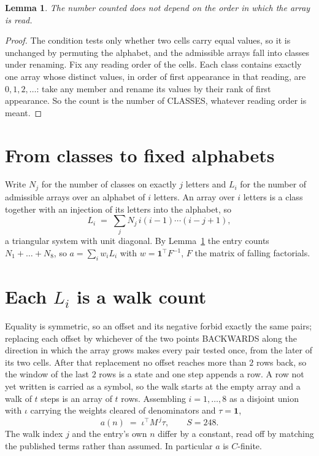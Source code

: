 \documentclass[11pt,a4paper]{article}
\theoremstyle{plain}
\newtheorem{lemma}[theorem]{Lemma}
\theoremstyle{definition}
\begin{document}
\begin{lemma}\label{lem:order}
The number counted does not depend on the order in which the array is read.
\end{lemma}

\begin{proof}
The condition tests only whether two cells carry equal values, so it is unchanged by permuting
the alphabet, and the admissible arrays fall into classes under renaming. Fix any reading order
of the cells. Each class contains exactly one array whose distinct values, in order of first
appearance in that reading, are $0,1,2,\dots$: take any member and rename its values by their
rank of first appearance. So the count is the number of CLASSES, whatever reading order is
meant.
\end{proof}

\section{From classes to fixed alphabets}

Write $N_j$ for the number of classes on exactly $j$ letters and $L_i$ for the number of
admissible arrays over an alphabet of $i$ letters. An array over $i$ letters is a class together
with an injection of its letters into the alphabet, so
\[
L_i\;=\;\sum_j N_j\,i(i-1)\cdots(i-j+1),
\]
a triangular system with unit diagonal. By Lemma~\ref{lem:order} the entry counts
$N_1+\dots+N_{8}$, so $a=\sum_i w_iL_i$ with $w=\mathbf{1}^{\!\top}F^{-1}$, $F$ the
matrix of falling factorials.

\section{Each $L_i$ is a walk count}

Equality is symmetric, so an offset and its negative forbid exactly the same pairs; replacing
each offset by whichever of the two points BACKWARDS along the direction in which the array
grows makes every pair tested once, from the later of its two cells. After that replacement no
offset reaches more than $2$ rows back, so the window of the last $2$
rows is a state and one step appends a row. A row not yet written is
carried as a symbol, so the walk starts at the empty array and a walk of $t$ steps is an array
of $t$ rows. Assembling $i=1,\dots,8$ as a disjoint union with $\iota$ carrying the
weights cleared of denominators and $\tau=\mathbf{1}$,
\[
a(n)\;=\;\iota^{\!\top}M^{\,j}\tau ,\qquad S=248.
\]
The walk index $j$ and the entry's own $n$ differ by a constant, read off by matching the
published terms rather than assumed. In particular $a$ is $C$-finite.
\end{document}

